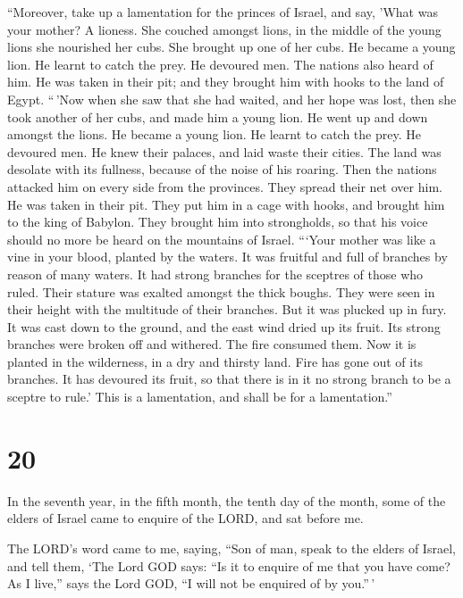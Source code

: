  ``Moreover, take up a lamentation for the princes of
Israel,  and say, 'What was your mother? A lioness. She
couched amongst lions, in the middle of the young lions she nourished
her cubs.  She brought up one of her cubs. He became a young
lion. He learnt to catch the prey. He devoured men.  The
nations also heard of him. He was taken in their pit; and they brought
him with hooks to the land of Egypt.  ``\,'Now when she saw
that she had waited, and her hope was lost, then she took another of her
cubs, and made him a young lion.  He went up and down
amongst the lions. He became a young lion. He learnt to catch the prey.
He devoured men.  He knew their palaces, and laid waste
their cities. The land was desolate with its fullness, because of the
noise of his roaring.  Then the nations attacked him on
every side from the provinces. They spread their net over him. He was
taken in their pit.  They put him in a cage with hooks, and
brought him to the king of Babylon. They brought him into strongholds,
so that his voice should no more be heard on the mountains of Israel.
 ```Your mother was like a vine in your blood, planted by
the waters. It was fruitful and full of branches by reason of many
waters.  It had strong branches for the sceptres of those
who ruled. Their stature was exalted amongst the thick boughs. They were
seen in their height with the multitude of their branches. 
But it was plucked up in fury. It was cast down to the ground, and the
east wind dried up its fruit. Its strong branches were broken off and
withered. The fire consumed them.  Now it is planted in the
wilderness, in a dry and thirsty land.  Fire has gone out
of its branches. It has devoured its fruit, so that there is in it no
strong branch to be a sceptre to rule.' This is a lamentation, and shall
be for a lamentation.''

\hypertarget{section-18}{%
\section{20}\label{section-18}}

 In the seventh year, in the fifth month, the tenth day of
the month, some of the elders of Israel came to enquire of the LORD, and
sat before me.

 The LORD's word came to me, saying,  ``Son of
man, speak to the elders of Israel, and tell them, `The Lord GOD says:
``Is it to enquire of me that you have come? As I live,'' says the Lord
GOD, ``I will not be enquired of by you.''\,'

